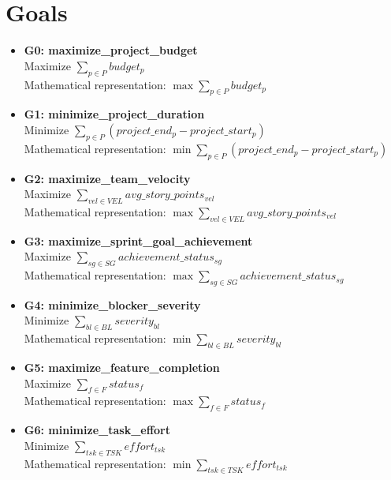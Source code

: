 \documentclass{article}
\begin{document}
\section{Goals}
\begin{itemize}
    \item \textbf{G0: maximize\_project\_budget} \\
    Maximize $\sum_{p \in P} budget_p$ \\
    Mathematical representation: $\max \sum_{p \in P} budget_p$

    \item \textbf{G1: minimize\_project\_duration} \\
    Minimize $\sum_{p \in P} (project\_end_p - project\_start_p)$ \\
    Mathematical representation: $\min \sum_{p \in P} (project\_end_p - project\_start_p)$

    \item \textbf{G2: maximize\_team\_velocity} \\
    Maximize $\sum_{vel \in VEL} avg\_story\_points_{vel}$ \\
    Mathematical representation: $\max \sum_{vel \in VEL} avg\_story\_points_{vel}$

    \item \textbf{G3: maximize\_sprint\_goal\_achievement} \\
    Maximize $\sum_{sg \in SG} achievement\_status_{sg}$ \\
    Mathematical representation: $\max \sum_{sg \in SG} achievement\_status_{sg}$

    \item \textbf{G4: minimize\_blocker\_severity} \\
    Minimize $\sum_{bl \in BL} severity_{bl}$ \\
    Mathematical representation: $\min \sum_{bl \in BL} severity_{bl}$

    \item \textbf{G5: maximize\_feature\_completion} \\
    Maximize $\sum_{f \in F} status_f$ \\
    Mathematical representation: $\max \sum_{f \in F} status_f$

    \item \textbf{G6: minimize\_task\_effort} \\
    Minimize $\sum_{tsk \in TSK} effort_{tsk}$ \\
    Mathematical representation: $\min \sum_{tsk \in TSK} effort_{tsk}$


\end{itemize}
\end{document}
